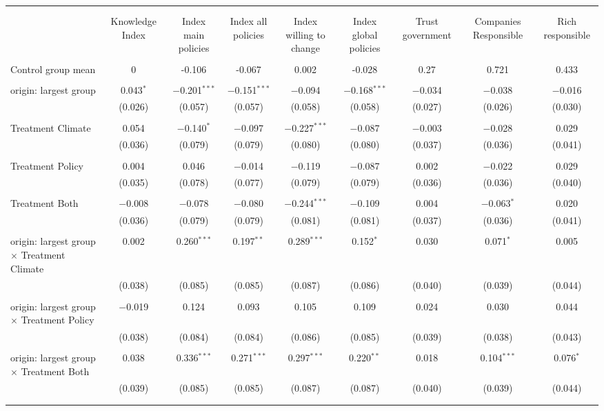 
\begin{tabular}{@{\extracolsep{5pt}}lcccccccc} 
\\[-1.8ex]\hline 
\hline \\[-1.8ex] 
\\[-1.8ex] & Knowledge Index & Index main policies & Index all policies & Index willing to change & Index global policies & Trust government & Companies Responsible & Rich responsible \\ 
\hline \\[-1.8ex] 
 Control group mean & 0 & -0.106 & -0.067 & 0.002 & -0.028 & 0.27 & 0.721 & 0.433  \\ \hline \\[-1.8ex] origin: largest group & 0.043$^{*}$ & $-$0.201$^{***}$ & $-$0.151$^{***}$ & $-$0.094 & $-$0.168$^{***}$ & $-$0.034 & $-$0.038 & $-$0.016 \\ 
  & (0.026) & (0.057) & (0.057) & (0.058) & (0.058) & (0.027) & (0.026) & (0.030) \\ 
  & & & & & & & & \\ 
 Treatment Climate & 0.054 & $-$0.140$^{*}$ & $-$0.097 & $-$0.227$^{***}$ & $-$0.087 & $-$0.003 & $-$0.028 & 0.029 \\ 
  & (0.036) & (0.079) & (0.079) & (0.080) & (0.080) & (0.037) & (0.036) & (0.041) \\ 
  & & & & & & & & \\ 
 Treatment Policy & 0.004 & 0.046 & $-$0.014 & $-$0.119 & $-$0.087 & 0.002 & $-$0.022 & 0.029 \\ 
  & (0.035) & (0.078) & (0.077) & (0.079) & (0.079) & (0.036) & (0.036) & (0.040) \\ 
  & & & & & & & & \\ 
 Treatment Both & $-$0.008 & $-$0.078 & $-$0.080 & $-$0.244$^{***}$ & $-$0.109 & 0.004 & $-$0.063$^{*}$ & 0.020 \\ 
  & (0.036) & (0.079) & (0.079) & (0.081) & (0.081) & (0.037) & (0.036) & (0.041) \\ 
  & & & & & & & & \\ 
 origin: largest group $\times$ Treatment Climate & 0.002 & 0.260$^{***}$ & 0.197$^{**}$ & 0.289$^{***}$ & 0.152$^{*}$ & 0.030 & 0.071$^{*}$ & 0.005 \\ 
  & (0.038) & (0.085) & (0.085) & (0.087) & (0.086) & (0.040) & (0.039) & (0.044) \\ 
  & & & & & & & & \\ 
 origin: largest group $\times$ Treatment Policy & $-$0.019 & 0.124 & 0.093 & 0.105 & 0.109 & 0.024 & 0.030 & 0.044 \\ 
  & (0.038) & (0.084) & (0.084) & (0.086) & (0.085) & (0.039) & (0.038) & (0.043) \\ 
  & & & & & & & & \\ 
 origin: largest group $\times$ Treatment Both & 0.038 & 0.336$^{***}$ & 0.271$^{***}$ & 0.297$^{***}$ & 0.220$^{**}$ & 0.018 & 0.104$^{***}$ & 0.076$^{*}$ \\ 
  & (0.039) & (0.085) & (0.085) & (0.087) & (0.087) & (0.040) & (0.039) & (0.044) \\ 
  & & & & & & & & \\ 
\hline \\[-1.8ex] 


\end{tabular}
